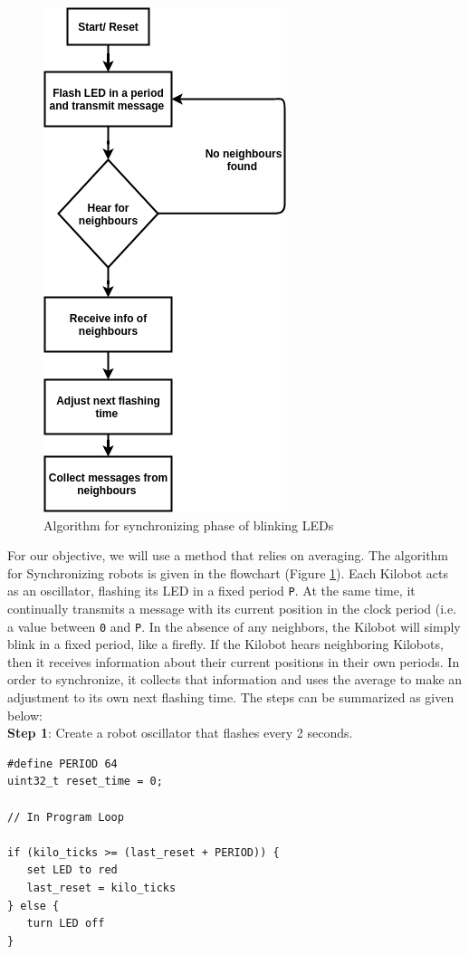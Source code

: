 \documentclass{report}[12pt]
\begin{document}
\begin{figure}
    \centering
	\includegraphics[scale=0.6]{images/sync-algo}
	\caption{Algorithm for synchronizing phase of blinking LEDs }
	\label{fig:sync}
\end{figure}

\noindent For our objective, we will use a method that relies on averaging. The algorithm for Synchronizing robots is given in the flowchart (Figure \ref{fig:sync}).  Each Kilobot acts as an oscillator, flashing its LED in a fixed period \texttt{P}.  At the same time, it continually transmits a message with its current position in the clock period (i.e. a value between \texttt{0} and \texttt{P}.  In the absence of any neighbors, the Kilobot will simply blink in a fixed period, like a firefly.  If the Kilobot hears neighboring Kilobots, then it receives information about their current positions in their own periods. In order to synchronize, it collects that information and uses the average to make an adjustment to its own next flashing time. The steps can be summarized as given below: \\ 

\noindent \textbf{Step 1}: Create a robot oscillator that flashes every 2 seconds.
\begin{verbatim}
#define PERIOD 64
uint32_t reset_time = 0;

// In Program Loop

if (kilo_ticks >= (last_reset + PERIOD)) {
   set LED to red
   last_reset = kilo_ticks
} else {
   turn LED off
}
\end{verbatim}
\end{document}
